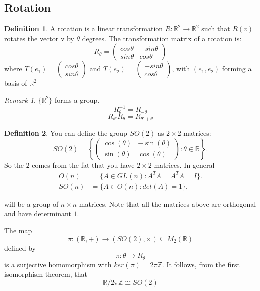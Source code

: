 \documentclass[12pt]{article}
\theoremstyle{definition}
\newtheorem{definition}{Definition}[section]
\theoremstyle{remark}
\newtheorem*{remark}{Remark}
\begin{document}
        \subsection{Rotation}
        \begin{definition}
            A rotation is a linear transformation $R: \mathbb{R}^2 \rightarrow \mathbb{R}^2$ such that $R(v)$ rotates the 
            vector v by $\theta$ degrees. The transformation matrix of a rotation is:
            $$ R_\theta = \begin{pmatrix}
                cos\theta & -sin\theta \\ sin\theta & cos\theta
            \end{pmatrix}$$
            where $T(e_1) =\begin{pmatrix}
                cos\theta \\ sin\theta 
            \end{pmatrix}$ and $T(e_2) =\begin{pmatrix}
                -sin\theta \\ cos\theta 
            \end{pmatrix}$, with $(e_1,e_2)$ forming a basis of $\mathbb{R}^2$

        \end{definition}
        \begin{remark}
            $\{\mathbb{R}^2\}$ forms a group. 
            $$R^{-1}_\theta = R_{-\theta}$$
            $$ R_{\theta'}R_{\theta}= R_{\theta'+\theta}$$
        \end{remark}
        \begin{definition}
            You can define the group $SO(2)$ as $2\times 2$ matrices:
            $$SO(2) = \left\{\begin{pmatrix}\cos(\theta) & -\sin(\theta) \\ \sin(\theta) & \cos(\theta)\end{pmatrix} : \theta\in \mathbb{R}\right\}.$$
            So the $2$ comes from the fat that you have $2\times 2$ matrices.
            In general
            \begin{align}
            O(n) &= \{A \in GL(n): A^TA = A^TA = I\}. \\
            SO(n) &= \{A \in O(n): det(A) = 1 \}.
            \end{align}
            
            will be a group of $n\times n$ matrices.
            Note that all the matrices above are orthogonal and have determinant $1$.
        \end{definition}
        \begin{proposition}
            The map
            $$\pi :(\mathbb{R},+)\rightarrow (SO(2),\times)\subseteq M_2(\mathbb{R})$$
            defined by $$\pi: \theta \rightarrow R_\theta$$
            is a surjective homomorphism with $ker(\pi) = 2 \pi \mathbb{Z}$. It follows, from the first isomorphism theorem,
            that $$\mathbb{R}/2\pi \mathbb{Z} \cong SO(2)$$

        \end{proposition}
\end{document}
